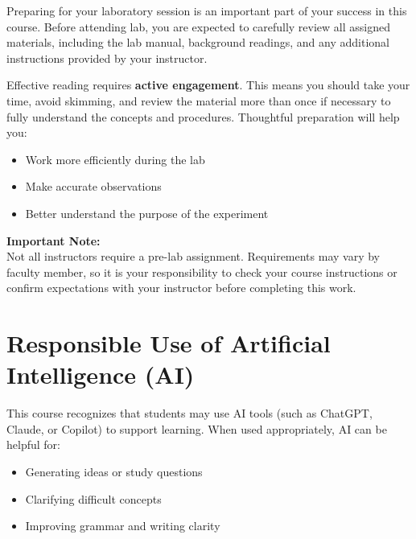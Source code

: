 \documentclass[
  letterpaper,
  DIV=11,
  numbers=noendperiod]{scrreprt}
\begin{document}

Preparing for your laboratory session is an important part of your
success in this course. Before attending lab, you are expected to
carefully review all assigned materials, including the lab manual,
background readings, and any additional instructions provided by your
instructor.

Effective reading requires \textbf{active engagement}. This means you
should take your time, avoid skimming, and review the material more than
once if necessary to fully understand the concepts and procedures.
Thoughtful preparation will help you:

\begin{itemize}
\item
  Work more efficiently during the lab
\item
  Make accurate observations
\item
  Better understand the purpose of the experiment
\end{itemize}

\textbf{Important Note:}\\
Not all instructors require a pre-lab assignment. Requirements may vary
by faculty member, so it is your responsibility to check your course
instructions or confirm expectations with your instructor before
completing this work.

\section*{\texorpdfstring{\textbf{Responsible Use of Artificial
Intelligence
(AI)}}{Responsible Use of Artificial Intelligence (AI)}}\label{responsible-use-of-artificial-intelligence-ai}


This course recognizes that students may use AI tools (such as ChatGPT,
Claude, or Copilot) to support learning. When used appropriately, AI can
be helpful for:

\begin{itemize}
\item
  Generating ideas or study questions
\item
  Clarifying difficult concepts
\item
  Improving grammar and writing clarity
\end{itemize}
\end{document}
